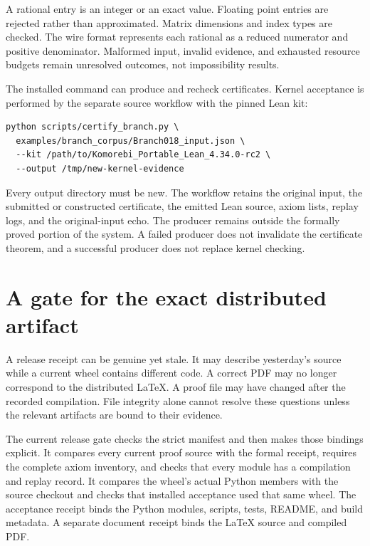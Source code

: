 \documentclass[11pt,letterpaper,oneside,openany]{book}
\theoremstyle{quiet}
\newcommand{\code}[1]{\texttt{\detokenize{#1}}}
\begin{document}
A rational entry is an integer or an exact \code{fractions.Fraction} value. Floating point entries are rejected rather than approximated. Matrix dimensions and index types are checked. The wire format represents each rational as a reduced numerator and positive denominator. Malformed input, invalid evidence, and exhausted resource budgets remain unresolved outcomes, not impossibility results.

The installed command can produce and recheck certificates. Kernel acceptance is performed by the separate source workflow with the pinned Lean kit:

\begin{Verbatim}[fontsize=\small,breaklines=true]
python scripts/certify_branch.py \
  examples/branch_corpus/Branch018_input.json \
  --kit /path/to/Komorebi_Portable_Lean_4.34.0-rc2 \
  --output /tmp/new-kernel-evidence
\end{Verbatim}

Every output directory must be new. The workflow retains the original input, the submitted or constructed certificate, the emitted Lean source, axiom lists, replay logs, and the original-input echo. The producer remains outside the formally proved portion of the system. A failed producer does not invalidate the certificate theorem, and a successful producer does not replace kernel checking.

\section{A gate for the exact distributed artifact}

A release receipt can be genuine yet stale. It may describe yesterday's source while a current wheel contains different code. A correct PDF may no longer correspond to the distributed LaTeX. A proof file may have changed after the recorded compilation. File integrity alone cannot resolve these questions unless the relevant artifacts are bound to their evidence.

The current release gate checks the strict manifest and then makes those bindings explicit. It compares every current proof source with the formal receipt, requires the complete axiom inventory, and checks that every module has a compilation and replay record. It compares the wheel's actual Python members with the source checkout and checks that installed acceptance used that same wheel. The acceptance receipt binds the Python modules, scripts, tests, README, and build metadata. A separate document receipt binds the LaTeX source and compiled PDF.
\end{document}
